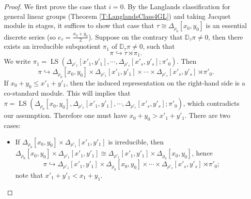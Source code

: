 \documentclass[11pt,letterpaper]{amsart}
\theoremstyle{plain}
\numberwithin{theorem}{section}
\numberwithin{equation}{subsection}
\theoremstyle{remark}
\newcommand{\LS}{\operatorname{LS}} %
\newcommand{\D}{\mathbb{D}}
\begin{document}
\begin{proof}
\iffalse%
We first prove the case that $i=0$. By the Langlands classification for general linear groups (Theorem \ref{T:LanglandsClass4GL}) and taking Jacquet module in stages, it suffices to show that case that $\tau\cong \Delta_{\rho_0}[x_0,y_0]$ is an essential discrete series (so $e_\tau=\frac{x_0+y_0}{2}$). Suppose on the contrary that $\D_{\tau}\pi \neq 0$, then there exists an irreducible subquotient $\pi_1$ of $\D_{\tau}\pi \neq 0$, such that
\[
    \pi \hookrightarrow \tau \rtimes \pi_1.
\]
We write $\pi_1=\LS\left(\Delta_{\rho'_1}[x'_1,y'_1],\cdots,\Delta_{\rho'_s}[x'_s,y'_s];\pi'_{0}\right)$. Then
\[
    \pi \hookrightarrow \Delta_{\rho_0}[x_0,y_0] \times \Delta_{\rho'_1}[x'_1,y'_1] \times \cdots \times \Delta_{\rho'_s}[x'_s,y'_s] \rtimes \pi'_{0}.
\]
If $x_0+y_0\leq x'_1+y'_1$, then the induced representation on the right-hand side is a co-standard module. This will implies that $\pi=\LS\left(\Delta_{\rho_0}[x_0,y_0] , \Delta_{\rho'_1}[x'_1,y'_1], \cdots , \Delta_{\rho'_r}[x'_s,y'_s] ; \pi'_{0}\right)$, which contradicts our assumption. Therefore one must have $x_0+y_0 > x'_1+y'_1$. There are two cases:

\begin{itemize}
    \item If $\Delta_{\rho_0}[x_0,y_0] \times \Delta_{\rho'_1}[x'_1,y'_1]$ is irreducible, then $\Delta_{\rho_0}[x_0,y_0] \times \Delta_{\rho'_1}[x'_1,y'_1] \cong \Delta_{\rho'_1}[x'_1,y'_1] \times \Delta_{\rho_0}[x_0,y_0]$, hence
    \begin{equation}\label{E:VanishingLemmaSwitching}
        \pi \hookrightarrow \Delta_{\rho'_1}[x'_1,y'_1] \times \Delta_{\rho_0}[x_0,y_0] \times \cdots \times \Delta_{\rho'_s}[x'_s,y'_s] \rtimes \pi'_{0};
    \end{equation}
    note that $x'_1+y'_1<x_1+y_1$.

    \vskip 5pt


\end{itemize}
\end{proof}
\end{document}
